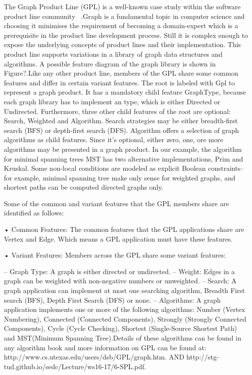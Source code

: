 

The Graph Product Line (GPL) is a well-known case study within the software product line community
~\cite{Lopez-Herrejon:2001:SPE:645418.652082}.Graph is a fundamental topic in computer science and choosing it minimises the requirement
of becoming a domain-expert which is a prerequisite in the product line development process. Still it is complex
enough to expose the underlying concepts of product lines and their implementation. This product line
 supports variations in a library of graph data structures and algorithms. A possible feature diagram of the graph
 library is shown in Figure?.Like any other product line, members of the GPL share some common features and differ in
 certain variant features. The root is labeled with Gpl to represent a graph product. It has a mandatory child feature
 GraphType, because each graph library has to implement an type, which is either Directed or Undirected. Furthermore,
 three other child features of the root are optional: Search, Weighted and Algorithm. Search strategies may be either
  breadth-first search (BFS) or depth-first search (DFS). Algorithm offers a selection of graph algorithms as child
  features. Since it's optional, either zero, one, ore more algorithms may be presented in a graph product. In our
  example, the algorithm for minimal spanning trees MST has two alternative implementations, Prim and Kruskal. Some
  non-local conditions are modeled as explicit Boolean constraints-- for example, minimal spanning tree make only
  sense for weighted graphs, and shortest paths can be computed directed graphs only.

  Some of the common and variant features that the GPL members share are identified as
  follows:

  • Common Features: The common features that the GPL applications share are Vertex and Edge.
  Which means a GPL application must have these features.

  • Variant Features: Members across the GPL share some variant features:

  – Graph Type: A graph is either directed or undirected.
  – Weight: Edges in a graph can be weighted with non-negative numbers or unweighted.
  – Search: A graph application can implement at most one searching algorithm, Breadth First
  search (BFS), Depth First Search (DFS) or none.
  – Algorithms: A graph application implements one or more of the following algorithms: Number
  (Vertex Numbering), Connected (Connected Components), Strongly (Strongly Connected
  Components), Cycle (Cycle Checking), Shortest (Single-Source Shortest Path) and MST(Minimum
  Spanning Tree).Details of these algorithms can be found in any algorithm book and more information
  on GPL can be found at: http://www.cs.utexas.edu/users/dsb/GPL/graph.htm.
  AND http://stg-tud.github.io/sedc/Lecture/ws16-17/6-SPL.pdf. %

